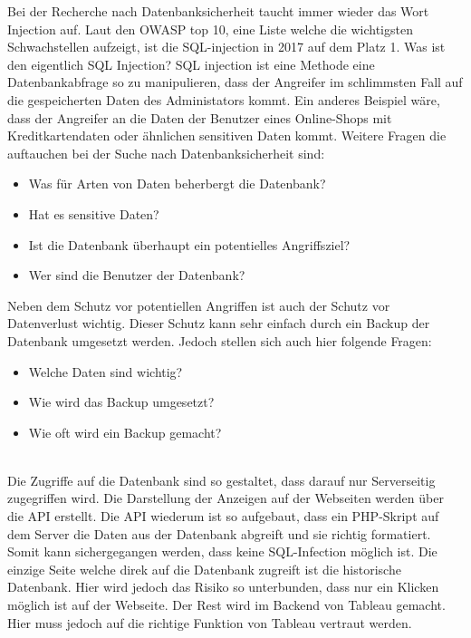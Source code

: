 Bei der Recherche nach Datenbanksicherheit taucht immer wieder das Wort Injection auf. Laut den OWASP top 10, eine Liste welche die wichtigsten Schwachstellen aufzeigt, ist die SQL-injection in 2017 auf dem Platz 1. Was ist den eigentlich SQL Injection? SQL injection ist eine Methode eine Datenbankabfrage so zu manipulieren, dass der Angreifer im schlimmsten Fall auf die gespeicherten Daten des Administators kommt. Ein anderes Beispiel wäre, dass der Angreifer an die Daten der Benutzer eines Online-Shops mit Kreditkartendaten oder ähnlichen sensitiven Daten kommt.
Weitere Fragen die auftauchen bei der Suche nach Datenbanksicherheit sind:
\begin{itemize}
\item Was für Arten von Daten beherbergt die Datenbank?
\item Hat es sensitive Daten?
\item Ist die Datenbank überhaupt ein potentielles Angriffsziel?
\item Wer sind die Benutzer der Datenbank?
\end{itemize}
Neben dem Schutz vor potentiellen Angriffen ist auch der Schutz vor Datenverlust wichtig. Dieser Schutz kann sehr einfach durch ein Backup der Datenbank umgesetzt werden. Jedoch stellen sich auch hier folgende Fragen:
\begin{itemize}
\item Welche Daten sind wichtig?
\item Wie wird das Backup umgesetzt?
\item Wie oft wird ein Backup gemacht?
\end{itemize}

\\
Die Zugriffe auf die Datenbank sind so gestaltet, dass darauf nur Serverseitig zugegriffen wird. Die Darstellung der Anzeigen auf der Webseiten werden über die API erstellt. Die API wiederum ist so aufgebaut, dass ein PHP-Skript auf dem Server die Daten aus der Datenbank abgreift und sie richtig formatiert. Somit kann sichergegangen werden, dass keine SQL-Infection möglich ist. Die einzige Seite welche direk auf die Datenbank zugreift ist die historische Datenbank. Hier wird jedoch das Risiko so unterbunden, dass nur ein Klicken möglich ist auf der Webseite. Der Rest wird im Backend von Tableau gemacht. Hier muss jedoch auf die richtige Funktion von Tableau vertraut werden. 


